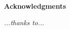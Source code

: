\thispagestyle{empty}

\begin{center}
  {\bf \Huge Acknowledgments}
\end{center}

\vspace{4cm}


\emph{
  ...thanks to...
}
